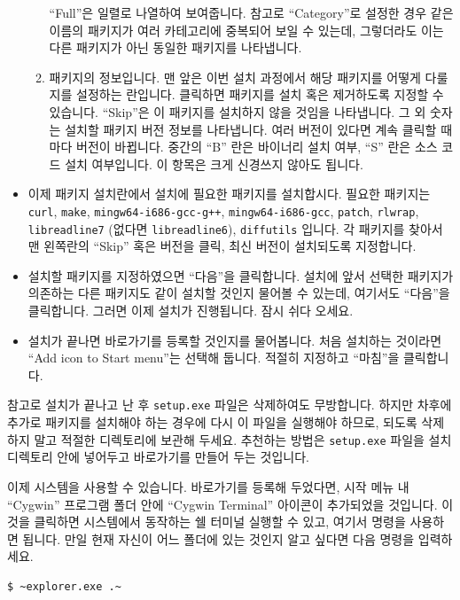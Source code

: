 \begin{itemize}
\begin{enumerate}
    ``Full''은 일렬로 나열하여 보여줍니다. 참고로 ``Category''로 설정한 경우
    같은 이름의 패키지가 여러 카테고리에 중복되어 보일 수 있는데, 그렇더라도
    이는 다른 패키지가 아닌 동일한 패키지를 나타냅니다.
  \item 패키지의 정보입니다. 맨 앞은 이번 설치 과정에서 해당 패키지를 어떻게
    다룰지를 설정하는 란입니다. 클릭하면 패키지를 설치 혹은 제거하도록 지정할
    수 있습니다. ``Skip''은 이 패키지를 설치하지 않을 것임을 나타냅니다. 그 외
    숫자는 설치할 패키지 버전 정보를 나타냅니다. 여러 버전이 있다면 계속
    클릭할 때마다 버전이 바뀝니다. 중간의 ``B'' 란은 바이너리 설치 여부, ``S''
    란은 소스 코드 설치 여부입니다. 이 항목은 크게 신경쓰지 않아도 됩니다.
  \end{enumerate}
\item 이제 패키지 설치란에서 \OCAML{} 설치에 필요한 패키지를
  설치합시다. 필요한 패키지는 \texttt{curl}, \texttt{make},
  \texttt{mingw64-i686-gcc-g++}, \texttt{mingw64-i686-gcc}, \texttt{patch},
  \texttt{rlwrap}, \texttt{libreadline7} (없다면 \texttt{libreadline6}),
  \texttt{diffutils} 입니다. 각 패키지를 찾아서 맨 왼쪽란의 ``Skip'' 혹은
  버전을 클릭, 최신 버전이 설치되도록 지정합니다.
\item 설치할 패키지를 지정하였으면 ``다음''을 클릭합니다. 설치에 앞서 선택한
  패키지가 의존하는 다른 패키지도 같이 설치할 것인지 물어볼 수 있는데,
  여기서도 ``다음''을 클릭합니다. 그러면 이제 설치가 진행됩니다. 잠시 쉬다
  오세요.
\item 설치가 끝나면 바로가기를 등록할 것인지를 물어봅니다. 처음 설치하는
  것이라면 ``Add icon to Start menu''는 선택해 둡니다. 적절히 지정하고
  ``마침''을 클릭합니다.
\end{itemize}

참고로 설치가 끝나고 난 후 \texttt{setup.exe} 파일은 삭제하여도
무방합니다. 하지만 차후에 추가로 패키지를 설치해야 하는 경우에 다시 이 파일을
실행해야 하므로, 되도록 삭제하지 말고 적절한 디렉토리에 보관해 두세요. 추천하는
방법은 \texttt{setup.exe} 파일을 \CYGWIN{} 설치 디렉토리 안에 넣어두고
바로가기를 만들어 두는 것입니다.

이제 \CYGWIN{} 시스템을 사용할 수 있습니다. 바로가기를 등록해 두었다면,
시작 메뉴 내 ``Cygwin'' 프로그램 폴더 안에 ``Cygwin Terminal'' 아이콘이
추가되었을 것입니다. 이것을 클릭하면 \CYGWIN{} 시스템에서 동작하는 쉘 터미널
실행할 수 있고, 여기서 \UNIX{} 명령을 사용하면 됩니다. 만일 현재 자신이
\WINDOWS{} 어느 폴더에 있는 것인지 알고 싶다면 다음 명령을 입력하세요.

\begin{lstlisting}
$ ~explorer.exe .~
\end{lstlisting}

